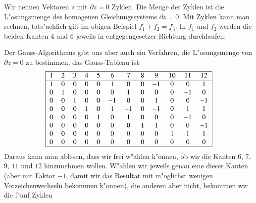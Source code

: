 Wir nennen Vektoren $z$ mit $\partial z=0$ Zyklen.
Die Menge der Zyklen ist die L"osungsmenge des homogenen
Gleichungssystems $\partial z=0$. Mit Zyklen kann man rechnen,
tats"achlich gilt im obigen Beispiel $f_1+f_2=f_3$. In $f_1$
und $f_2$ werden die beiden Kanten $4$ und $6$ jeweils in
entgegengesetzer Richtung durchlaufen.

Der Gauss-Algorithmus gibt uns aber auch ein Verfahren, die
L"osungsmenge von $\partial z=0$ zu bestimmen, das Gauss-Tableau
ist:
\[
\begin{tabular}{|cccccccccccc|}
\hline
   1&  2&  3&  4&  5&  6&  7&  8&  9& 10& 11& 12\\
\hline
   1&  0&  0&  0&  0&  1&  0&  0&$-1$&  0&  0&  1\\
   0&  1&  0&  0&  0&  0&  1&  0&  0&  0&$-1$&  0\\
   0&  0&  1&  0&  0&$-1$&  0&  0&  1&  0&  0&$-1$\\
   0&  0&  0&  1&  0&  1&$-1$&  0&$-1$&  0&  1&  1\\
   0&  0&  0&  0&  1&  0&  1&  0&  0&  0&$-1$&  0\\
   0&  0&  0&  0&  0&  0&  0&  1&  1&  0&  0&$-1$\\
   0&  0&  0&  0&  0&  0&  0&  0&  0&  1&  1&  1\\
   0&  0&  0&  0&  0&  0&  0&  0&  0&  0&  0&  0\\
\hline
\end{tabular}
\]
Daraus kann man ablesen, dass wir frei w"ahlen
k"onnen, ob wir die Kanten $6$, $7$, $9$, $11$ und $12$
hinzunehmen wollen. W"ahlen wir jeweils genau
eine dieser Kanten (aber mit Faktor $-1$, damit wir das Resultat
mit m"oglichst wenigen Vorzeichenwechseln bekommen k"onnen),
die anderen aber nicht, bekommen wir die f"unf Zyklen

